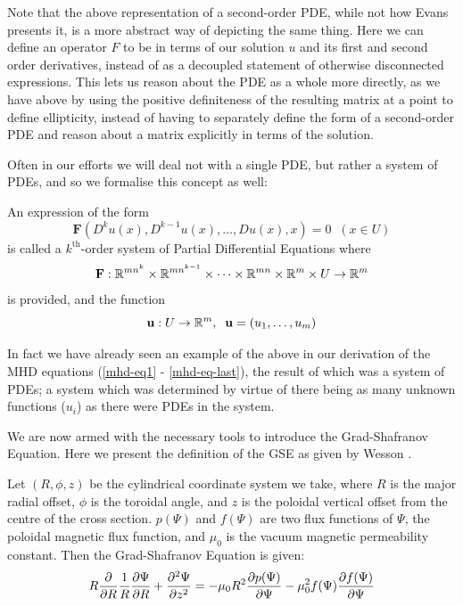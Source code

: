 \begin{remark}
    Note that the above representation of a second-order PDE, while not how Evans presents it, is a more abstract way of 
    depicting the same thing. Here we can define an operator $F$ to be in terms of our solution $u$ and its first and second order derivatives, 
    instead of as a decoupled statement of otherwise disconnected expressions. This lets us reason about the PDE 
    as a whole more directly, as we have above by using the positive definiteness of the resulting matrix at a point to define 
    ellipticity, instead of having to separately define the form of a second-order PDE and reason about a matrix explicitly in terms 
    of the solution. 
\end{remark}

Often in our efforts we will deal not with a single PDE, but rather a system of PDEs, and so we formalise this concept as well:

\begin{definition}
    An expression of the form
    \begin{equation}
        \mathbf{F} (D^k u(x), D^{k-1} u(x), \dots, D u(x), x) = 0 \;\; (x \in U)
    \end{equation}
    is called a $k^{\text{th}}$-order system of Partial Differential Equations where
    $$\mathbf{F}: \mathbb{R}^{mn^{k}} \times \mathbb{R}^{m n^{k-1}} \times \dots \times \mathbb{R}^{mn} \times \mathbb{R}^m \times U \to \mathbb{R}^{m}$$
    is provided, and the function
    $$\mathbf{u}: U \to \mathbb{R}^m, \;\; \mathbf{u} = (u_1, \dots, u_m)$$
\end{definition}

In fact we have already seen an example of the above in our derivation of the MHD equations (\eqref{mhd-eq1} - \eqref{mhd-eq-last}), the 
result of which was a system of PDEs; a system which was determined by virtue of there being as many unknown functions ($u_i$) as there were 
PDEs in the system.

We are now armed with the necessary tools to introduce the Grad-Shafranov Equation. Here we present the definition of the GSE as given by Wesson \cite{wesson-tokamaks}.
\begin{definition}
    Let $(R, \phi, z)$ be the cylindrical coordinate system 
    we take, where $R$ is the major radial offset, $\phi$ is the toroidal angle, and $z$ is the poloidal vertical offset from the centre 
    of the cross section. $p(\Psi)$ and $f(\Psi)$ are two flux functions of $\Psi$, the poloidal magnetic flux function, and $\mu_0$ is the 
    vacuum magnetic permeability constant. Then the Grad-Shafranov Equation is given:
    \begin{equation}
        \label{gse-formal}
        R \pdv{}{R} \frac{1}{R} \pdv{\Psi}{R} + \pdv[2]{\Psi}{z} = -\mu_0 R^2 \pdv{p(\Psi)}{\Psi} - \mu_0^2 f(\Psi) \pdv{f(\Psi)}{\Psi}
    \end{equation}
\end{definition}

